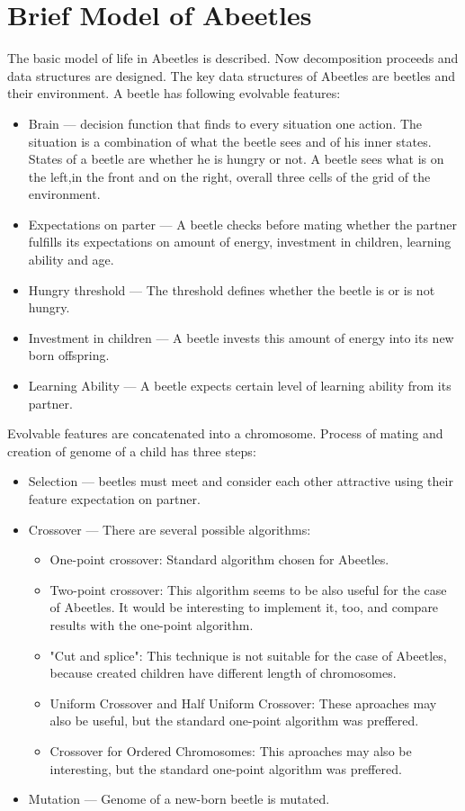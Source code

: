 \documentclass[a4paper,12pt]{report}
\begin{document}
\section{Brief Model of Abeetles}
The basic model of life in Abeetles is described. Now decomposition proceeds and data structures are designed.
The key data structures of Abeetles are beetles and their environment.
A beetle has following evolvable features:
\begin {itemize}
\item Brain --- decision function that finds to every situation one action. The situation is a combination of what the beetle sees and of his inner states. States of a beetle are whether he is hungry or not. A beetle sees what is on the left,in the front and on the right, overall three cells of the grid of the environment.
\item Expectations on parter --- A beetle checks before mating whether the partner  fulfills its expectations on amount of energy, investment in children, learning ability and age.
\item Hungry threshold --- The threshold defines whether the beetle is or is not hungry.  
\item Investment in children --- A beetle invests this amount of energy into its new born offspring.
\item Learning Ability --- A beetle expects certain level of learning ability from its partner.
\end {itemize}

Evolvable features are concatenated into a chromosome. Process of mating and creation of genome of a child has three steps:

\begin{itemize}
  \item Selection --- beetles must meet and consider each other attractive using their feature expectation on partner. 
  \item Crossover --- There are several possible algorithms:
    \begin{itemize}
      \item One-point crossover: Standard algorithm chosen for Abeetles.
      \item Two-point crossover: This algorithm seems to be also useful for the case of Abeetles. It would be interesting to implement it, too, and compare results with the one-point algorithm. 
      \item "Cut and splice": This technique is not suitable for the case of Abeetles, because created children have different length of chromosomes.
      \item Uniform Crossover and Half Uniform Crossover: These aproaches may also be useful, but the standard one-point algorithm was preffered.
      \item Crossover for Ordered Chromosomes: This aproaches may also be interesting, but the standard one-point algorithm was preffered.
    \end {itemize}
  \item Mutation --- Genome of a new-born beetle is mutated.
\end {itemize}
\end{document}
